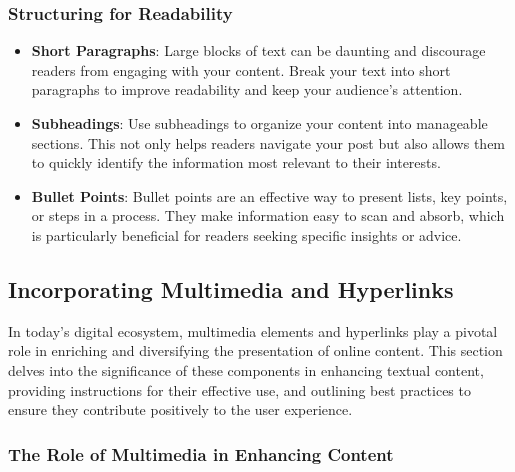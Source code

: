 \documentclass[
]{book}
\begin{document}
\hypertarget{structuring-for-readability}{%
\subsubsection*{Structuring for Readability}\label{structuring-for-readability}}

\begin{itemize}
\item
  \textbf{Short Paragraphs}: Large blocks of text can be daunting and discourage readers from engaging with your content. Break your text into short paragraphs to improve readability and keep your audience's attention.
\item
  \textbf{Subheadings}: Use subheadings to organize your content into manageable sections. This not only helps readers navigate your post but also allows them to quickly identify the information most relevant to their interests.
\item
  \textbf{Bullet Points}: Bullet points are an effective way to present lists, key points, or steps in a process. They make information easy to scan and absorb, which is particularly beneficial for readers seeking specific insights or advice.
\end{itemize}

\hypertarget{incorporating-multimedia-and-hyperlinks}{%
\subsection*{Incorporating Multimedia and Hyperlinks}\label{incorporating-multimedia-and-hyperlinks}}

In today's digital ecosystem, multimedia elements and hyperlinks play a pivotal role in enriching and diversifying the presentation of online content. This section delves into the significance of these components in enhancing textual content, providing instructions for their effective use, and outlining best practices to ensure they contribute positively to the user experience.

\hypertarget{the-role-of-multimedia-in-enhancing-content}{%
\subsubsection*{The Role of Multimedia in Enhancing Content}\label{the-role-of-multimedia-in-enhancing-content}}
\end{document}
